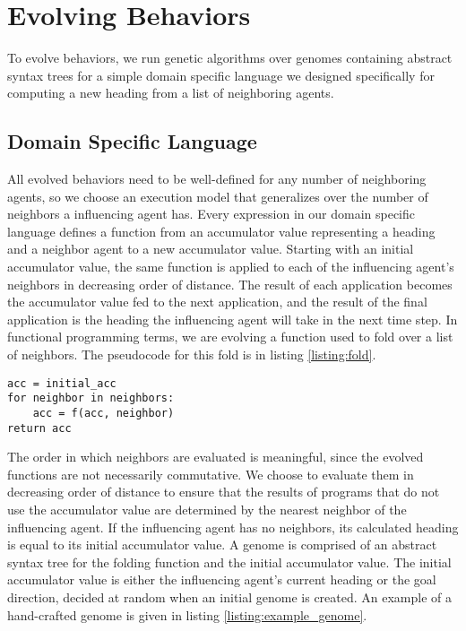 \section{Evolving Behaviors}
To evolve behaviors, we run genetic algorithms over genomes containing
abstract syntax trees for a simple domain specific language we designed
specifically for computing a new heading from a list of neighboring agents.

\subsection{Domain Specific Language}
All evolved behaviors need to be well-defined for any number of
neighboring agents, so we choose an execution model that generalizes over the
number of neighbors a influencing agent has.
Every expression in our domain specific language defines a function from an
accumulator value representing a heading and a neighbor agent to a new
accumulator value.
Starting with an initial accumulator value, the same function is applied to
each of the influencing agent's neighbors in decreasing order of distance.
The result of each application becomes the accumulator value fed to the next
application, and the result of the final application is the heading the
influencing agent will take in the next time step.
In functional programming terms, we are evolving a function used to fold over a
list of neighbors.
The pseudocode for this fold is in listing \ref{listing:fold}.

\begin{lstlisting}[caption={A fold},captionpos=b,label={listing:fold}]
acc = initial_acc
for neighbor in neighbors:
    acc = f(acc, neighbor)
return acc
\end{lstlisting}

The order in which neighbors are evaluated is meaningful, since the evolved
functions are not necessarily commutative.
We choose to evaluate them in decreasing order of distance to ensure that the
results of programs that do not use the accumulator value are determined by the
nearest neighbor of the influencing agent.
If the influencing agent has no neighbors, its calculated heading is equal to
its initial accumulator value.
A genome is comprised of an abstract syntax tree for the folding function and
the initial accumulator value.
The initial accumulator value is either the influencing agent's current heading
or the goal direction, decided at random when an initial genome is created.
An example of a hand-crafted genome is given in listing
\ref{listing:example_genome}.

